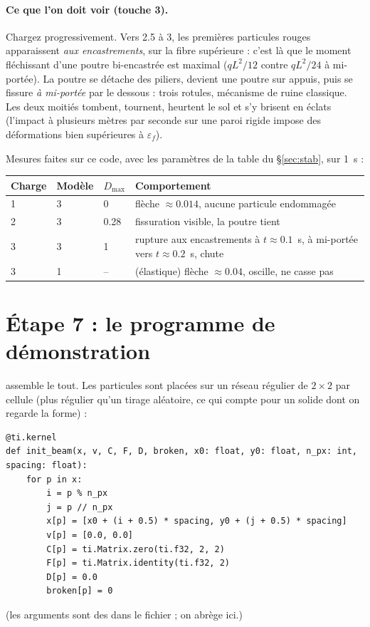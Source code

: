 \documentclass[11pt,a4paper]{article}
\newcommand{\code}[1]{\texttt{\detokenize{#1}}}
\begin{document}
\paragraph{Ce que l'on doit voir (touche 3).} Chargez progressivement. Vers 2.5 à 3, les premières
particules rouges apparaissent \emph{aux encastrements}, sur la fibre supérieure : c'est là que le
moment fléchissant d'une poutre bi-encastrée est maximal ($qL^2/12$ contre $qL^2/24$ à
mi-portée). La poutre se détache des piliers, devient une poutre sur appuis, puis se fissure
\emph{à mi-portée} par le dessous : trois rotules, mécanisme de ruine classique. Les deux moitiés
tombent, tournent, heurtent le sol et s'y brisent en éclats (l'impact à plusieurs mètres par
seconde sur une paroi rigide impose des déformations bien supérieures à $\varepsilon_f$).

Mesures faites sur ce code, avec les paramètres de la table du \S\ref{sec:stab}, sur 1~s :

\begin{center}
\begin{tabular}{@{}llll@{}}
\toprule
Charge & Modèle & $D_{\max}$ & Comportement \\
\midrule
1 & 3 & 0 & flèche $\approx 0.014$, aucune particule endommagée \\
2 & 3 & 0.28 & fissuration visible, la poutre tient \\
3 & 3 & 1 & rupture aux encastrements à $t\approx0.1$~s, à mi-portée vers $t\approx0.2$~s, chute \\
3 & 1 & -- & (élastique) flèche $\approx 0.04$, oscille, ne casse pas \\
\bottomrule
\end{tabular}
\end{center}

\section{Étape 7 : le programme de démonstration}

\code{MpM/demo_solid.py} assemble le tout. Les particules sont placées sur un réseau régulier de
$2\times2$ par cellule (plus régulier qu'un tirage aléatoire, ce qui compte pour un solide dont on
regarde la forme) :

\begin{lstlisting}
@ti.kernel
def init_beam(x, v, C, F, D, broken, x0: float, y0: float, n_px: int, spacing: float):
    for p in x:
        i = p % n_px
        j = p // n_px
        x[p] = [x0 + (i + 0.5) * spacing, y0 + (j + 0.5) * spacing]
        v[p] = [0.0, 0.0]
        C[p] = ti.Matrix.zero(ti.f32, 2, 2)
        F[p] = ti.Matrix.identity(ti.f32, 2)
        D[p] = 0.0
        broken[p] = 0
\end{lstlisting}
(les arguments \code{x, v, ...} sont des \code{ti.template()} dans le fichier ; on abrège ici.)
\end{document}
